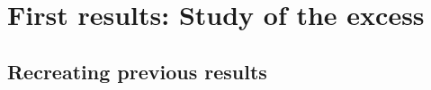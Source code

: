 \chapter{First results: Study of the excess}
\label{ch:results}
%

\section{Recreating previous results}
\label{sec:results_recreating_prev_res}



